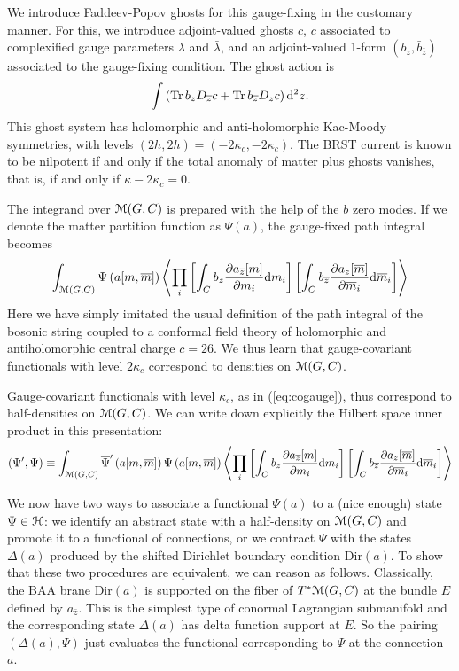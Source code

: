 \documentclass[11pt,a4paper]{article}
\begin{document}
We  introduce Faddeev-Popov ghosts for this gauge-fixing in the customary manner. For this, we introduce adjoint-valued ghosts $c$, $\bar c$ associated to complexified gauge parameters $\lambda$ and $\bar \lambda$, and  an adjoint-valued 1-form $(b_z, \bar b_{\bar z})$
associated to the gauge-fixing condition. The ghost action is 
\begin{equation}
\int\left( {\rm Tr} \,b_z D_{\overline z} c +  {\rm Tr} \,b_{\overline z} D_z c\right)\mathrm d^2z.
\end{equation}  
This ghost system has holomorphic and anti-holomorphic Kac-Moody symmetries, with levels $(2h,2h)=(-2\kappa_c, -2\kappa_c)$.
The BRST current is known to be nilpotent if and only if  the total anomaly of matter plus ghosts vanishes, that is, if and only if $\kappa - 2 \kappa_c=0$.

The integrand over ${\mathcal M}(G,C)$ is prepared with the help of the $b$ zero modes. If we denote the matter partition function as $\Psi(a)$, the gauge-fixed path integral becomes 
\begin{equation}
\int_{{\mathcal M}(G,C)} \Psi\left(a[m,\overline m]\right) \left\langle \prod_i \left[\int_C b_z \frac{\partial a_{\overline z}[m]}{\partial m_i} \mathrm d m_i \right] \left[\int_C b_{\overline z} \frac{\partial a_{z}[\overline m]}{\partial \overline m_i} \mathrm d \overline m_i \right] \right\rangle
\end{equation}   Here we have simply imitated the usual definition of the path integral of the bosonic string coupled to a conformal field theory of
holomorphic and antiholomorphic central charge $c=26$.
We thus learn that gauge-covariant functionals with level $2 \kappa_c$ correspond to densities on ${\mathcal M}(G,C)$. 

Gauge-covariant functionals with level $\kappa_c$, as in (\ref{eq:cogauge}), thus correspond to half-densities on ${\mathcal M}(G,C)$. We can write down explicitly the Hilbert space inner product in this presentation:
\begin{equation}\label{eq:innergauge}
\left( \Psi', \Psi \right) \equiv \int_{{\mathcal M}(G,C)} \overline{\Psi}'\left(a[m,\overline m]\right) \Psi\left(a[m,\overline m]\right) \left\langle \prod_i \left[\int_C b_z \frac{\partial a_{\overline z}[m]}{\partial m_i} \mathrm d m_i \right] \left[\int_C b_{\overline z} \frac{\partial a_{z}[\overline m]}{\partial \overline m_i} \mathrm d \overline m_i \right] \right\rangle
\end{equation}

We now have two ways to associate a functional $\Psi(a)$ to a (nice enough) state $\Psi \in {\mathcal H}$: we identify an abstract state with a half-density on ${\mathcal M}(G,C)$ and promote 
it to a functional of connections, or we contract $\Psi$ with the states $\Delta(a)$ produced by the shifted Dirichlet boundary condition $\mathrm{Dir}(a)$.  To show
that these two procedures are equivalent, we can reason as follows.
Classically, the BAA brane $\mathrm{Dir}(a)$ is supported on the fiber of $T^*{\mathcal M}(G,C)$ at the bundle $E$ defined by $a_{\bar z}$. 
This is the simplest type of conormal Lagrangian submanifold  and the corresponding state $\Delta(a)$ has delta function support
at $E$. So the pairing  $ (\Delta(a), \Psi)$ 
just evaluates the functional corresponding to $\Psi$ at the connection $a$.
\end{document}
